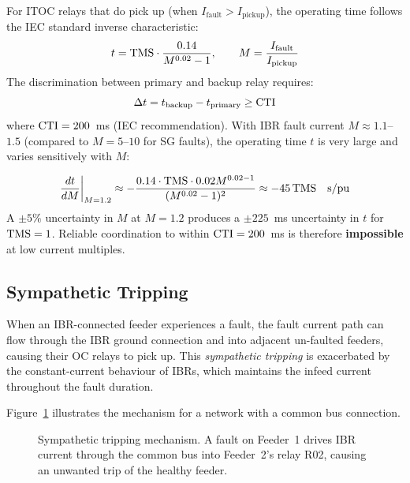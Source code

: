 For ITOC relays that do pick up (when $I_\mathrm{fault} > I_\mathrm{pickup}$),
the operating time follows the IEC standard inverse characteristic:
\begin{equation}
  t = \mathrm{TMS} \cdot \frac{0.14}{M^{0.02} - 1}, \qquad
  M = \frac{I_\mathrm{fault}}{I_\mathrm{pickup}}
  \label{eq:ch3_iec_itoc}
\end{equation}
The discrimination between primary and backup relay requires:
\begin{equation}
  \Delta t = t_\mathrm{backup} - t_\mathrm{primary} \geq \mathrm{CTI}
  \label{eq:ch3_cti}
\end{equation}
where $\mathrm{CTI} = 200$~ms (IEC recommendation). With IBR fault current
$M \approx 1.1$--$1.5$ (compared to $M = 5$--$10$ for SG faults), the
operating time $t$ is very large and varies sensitively with $M$:

\begin{equation}
  \frac{dt}{dM}\bigg|_{M=1.2} \approx -\frac{0.14 \cdot \mathrm{TMS} \cdot 0.02 M^{0.02-1}}{(M^{0.02}-1)^2}
  \approx -45\,\mathrm{TMS} \quad \text{s/pu}
  \label{eq:ch3_dtdm}
\end{equation}
A $\pm 5\%$ uncertainty in $M$ at $M = 1.2$ produces a $\pm 225$~ms
uncertainty in $t$ for $\mathrm{TMS} = 1$. Reliable coordination to within
$\mathrm{CTI} = 200$~ms is therefore \textbf{impossible} at low current multiples.

\subsection{Sympathetic Tripping}

When an IBR-connected feeder experiences a fault, the fault current path
can flow through the IBR ground connection and into adjacent un-faulted
feeders, causing their OC relays to pick up. This \emph{sympathetic
tripping} is exacerbated by the constant-current behaviour of IBRs, which
maintains the infeed current throughout the fault duration.

Figure~\ref{fig:ch3_sympathetic} illustrates the mechanism for a network
with a common bus connection.

\begin{figure}[htbp]
  \centering
  
  \caption{Sympathetic tripping mechanism. A fault on Feeder~1 drives
           IBR current through the common bus into Feeder~2's relay R02,
           causing an unwanted trip of the healthy feeder.}
  \label{fig:ch3_sympathetic}
\end{figure}

